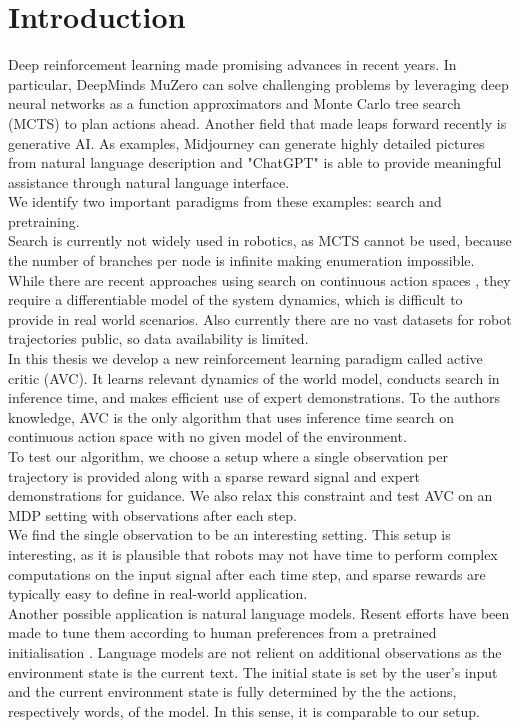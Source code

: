 \chapter{Introduction}
\label{chapter:Introduction}
Deep reinforcement learning made promising advances in recent years. In particular, DeepMinds MuZero \cite{MUZero} can solve challenging problems by leveraging deep neural networks as a function 
approximators and Monte Carlo tree search (MCTS) to plan actions ahead. 
Another field that made leaps forward recently is generative AI. As examples, Midjourney \cite{midjourney} 
can generate highly detailed pictures from natural 
language description and "ChatGPT" is able to provide meaningful assistance through natural language interface. \\
We identify two important paradigms from these examples: search and pretraining. \\
Search is currently not widely used in robotics, as MCTS cannot be used, because the number of branches per node is infinite making enumeration impossible. While there are recent approaches 
using search on continuous action spaces \cite{Manna2022} \cite{Lee_Jeon_Kim_Kim_2020}, they require a differentiable model of the system dynamics, which is difficult to provide in real world scenarios. 
Also currently there are no vast datasets for robot trajectories public, so data availability is limited.\\ 
In this thesis we develop a new reinforcement learning 
paradigm called active critic (AVC). It learns relevant dynamics of the world model, conducts search in inference time, and makes efficient use of expert demonstrations. 
To the authors knowledge, AVC is the only algorithm that uses inference time search on continuous action space with no given model of the environment.\\
To test our algorithm, we choose a setup where a single observation per trajectory is provided along with a sparse reward signal and expert demonstrations for guidance. 
We also relax this constraint and test AVC on an MDP setting with observations after each step.\\

We find the single observation to be an interesting setting. This setup is interesting, as it is plausible that robots may not have time to perform complex computations 
on the input signal after each time step, and sparse rewards are typically easy to define in real-world application.\\
Another possible application is natural language models. Resent efforts have been made to tune 
them according to human preferences from a pretrained initialisation \cite{cite:ChatGPT}. Language models are not relient on additional observations as the environment state is the current 
text. The initial state is set by the user's input and the current environment state is fully determined by the the actions, respectively words, of the model. 
In this sense, it is comparable to our setup.\\


